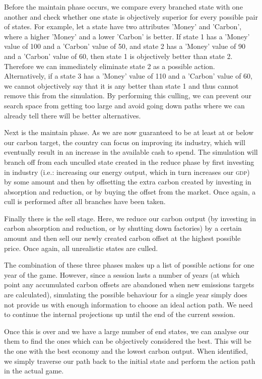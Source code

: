 Before the maintain phase occurs, we compare every branched state with one another and check whether one state is objectively superior for every possible pair of states. For example, let a state have two attributes 'Money' and 'Carbon', where a higher 'Money' and a lower 'Carbon' is better. If state 1 has a 'Money' value of 100 and a 'Carbon' value of 50, and state 2 has a 'Money' value of 90 and a 'Carbon' value of 60, then state 1 is objectively better than state 2. Therefore we can immediately eliminate state 2 as a possible action. Alternatively, if a state 3 has a 'Money' value of 110 and a 'Carbon' value of 60, we cannot objectively say that it is any better than state 1 and thus cannot remove this from the simulation. By performing this culling, we can prevent our search space from getting too large and avoid going down paths where we can already tell there will be better alternatives.

Next is the maintain phase. As we are now guaranteed to be at least at or below our carbon target, the country can focus on improving its industry, which will eventually result in an increase in the available cash to spend. The simulation will branch off from each unculled state created in the reduce phase by first investing in industry (i.e.: increasing our energy output, which in turn increases our \textsc{gdp}) by some amount and then by offsetting the extra carbon created by investing in absorption and reduction, or by buying the offset from the market. Once again, a cull is performed after all branches have been taken.

Finally there is the sell stage. Here, we reduce our carbon output (by investing in carbon absorption and reduction, or by shutting down factories) by a certain amount and then sell our newly created carbon offset at the highest possible price. Once again, all unrealistic states are culled.

The combination of these three phases makes up a list of possible actions for one year of the game. However, since a session lasts a number of years (at which point any accumulated carbon offsets are abandoned when new emissions targets are calculated), simulating the possible behaviour for a single year simply does not provide us with enough information to choose an ideal action path. We need to continue the internal projections up until the end of the current session.

Once this is over and we have a large number of end states, we can analyse our them to find the ones which can be objectively considered the best. This will be the one with the best economy and the lowest carbon output. When identified, we simply traverse our path back to the initial state and perform the action path in the actual game.

